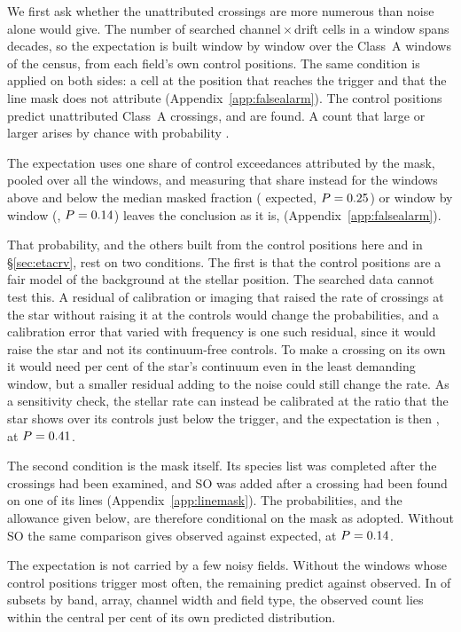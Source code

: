 We first ask whether the unattributed crossings are more numerous than
noise alone would give. The number of searched channel\,$\times$\,drift
cells in a window spans \TuCellsDecades{} decades, so the expectation is
built window by window over the \CeNWin{} Class~A windows of the census,
from each field's own control positions. The same condition is applied on
both sides: a cell at the position that reaches the trigger and that the
line mask does not attribute (Appendix~\ref{app:falsealarm}). The control
positions predict \CeExp{} unattributed Class~A crossings, and \CeObs{} are
found. A count that large or larger arises by chance with probability
\CeProbNull.

The expectation uses one share of control exceedances attributed by the
mask, pooled over all the windows, and measuring that share instead for the
windows above and below the median masked fraction (\CgAwStratExp{}
expected, $P=0.25$) or window by window (\CgAwShrExp,
$P=0.14$) leaves the conclusion as it is, \CgAwStratClause{}
(Appendix~\ref{app:falsealarm}).

That probability, and the others built from the control positions here and
in \S\ref{sec:etacrv}, rest on two conditions. The first is that the control
positions are a fair model of the background at the stellar position. The
searched data cannot test this. A residual of calibration or imaging that
raised the rate of crossings at the star without raising it at the controls
would change the probabilities, and a calibration error that varied with
frequency is one such residual, since it would raise the star and not its
continuum-free controls. To make a crossing on its own it would need
\CyEpsMinPct{} per cent of the star's continuum even in the least demanding
window, but a smaller residual adding to the noise could still change the
rate. As a sensitivity check, the stellar rate can instead be calibrated at
the ratio \CeNear{} that the star shows over its controls just below the
trigger, and the expectation is then \CeExpNear{}, at $P=0.41$.

The second condition is the mask itself. Its species list was completed
after the crossings had been examined, and SO was added after a crossing had
been found on one of its lines (Appendix~\ref{app:linemask}). The
probabilities, and the allowance given below, are therefore conditional on
the mask as adopted. Without SO the same comparison gives \MkNoSOObs{}
observed against \MkNoSOExp{} expected, at $P=0.14$.

The expectation is not carried by a few noisy fields. Without the
\BgTopNWord{} windows whose control positions trigger most often, the
remaining \BgDropTenNWin{} predict \BgDropTenExp{} against \BgDropTenObs{}
observed. In \BgNConfIn{} of \BgNConf{} subsets by band, array, channel
width and field type, the observed count lies within the central
\CeCovPct{} per cent of its own predicted distribution.

